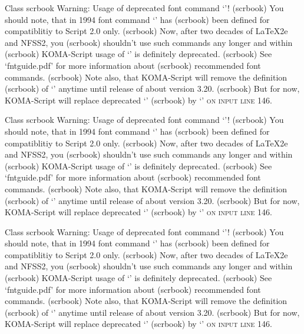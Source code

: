 Class scrbook Warning: Usage of deprecated font command `\sc'!
(scrbook)              You should note, that in 1994 font command `\sc' has
(scrbook)              been defined for compatiblitiy to Script 2.0 only.
(scrbook)              Now, after two decades of LaTeX2e and NFSS2, you
(scrbook)              shouldn't use such commands any longer and within
(scrbook)              KOMA-Script usage of `\sc' is definitely deprecated.
(scrbook)              See `fntguide.pdf' for more information about
(scrbook)              recommended font commands.
(scrbook)              Note also, that KOMA-Script will remove the definition
(scrbook)              of `\sc' anytime until release of about version 3.20.
(scrbook)              But for now, KOMA-Script will replace deprecated `\sc'
(scrbook)              by `\normalfont \scshape ' on input line 146.


Class scrbook Warning: Usage of deprecated font command `\sc'!
(scrbook)              You should note, that in 1994 font command `\sc' has
(scrbook)              been defined for compatiblitiy to Script 2.0 only.
(scrbook)              Now, after two decades of LaTeX2e and NFSS2, you
(scrbook)              shouldn't use such commands any longer and within
(scrbook)              KOMA-Script usage of `\sc' is definitely deprecated.
(scrbook)              See `fntguide.pdf' for more information about
(scrbook)              recommended font commands.
(scrbook)              Note also, that KOMA-Script will remove the definition
(scrbook)              of `\sc' anytime until release of about version 3.20.
(scrbook)              But for now, KOMA-Script will replace deprecated `\sc'
(scrbook)              by `\normalfont \scshape ' on input line 146.


Class scrbook Warning: Usage of deprecated font command `\sc'!
(scrbook)              You should note, that in 1994 font command `\sc' has
(scrbook)              been defined for compatiblitiy to Script 2.0 only.
(scrbook)              Now, after two decades of LaTeX2e and NFSS2, you
(scrbook)              shouldn't use such commands any longer and within
(scrbook)              KOMA-Script usage of `\sc' is definitely deprecated.
(scrbook)              See `fntguide.pdf' for more information about
(scrbook)              recommended font commands.
(scrbook)              Note also, that KOMA-Script will remove the definition
(scrbook)              of `\sc' anytime until release of about version 3.20.
(scrbook)              But for now, KOMA-Script will replace deprecated `\sc'
(scrbook)              by `\normalfont \scshape ' on input line 146.


